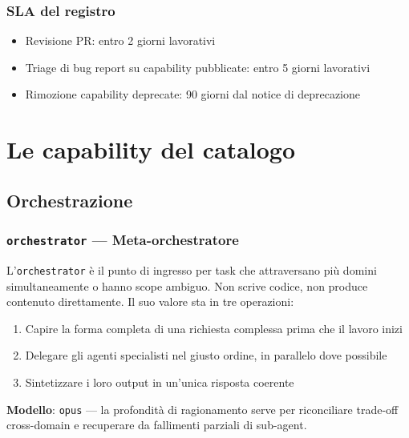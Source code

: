 \documentclass[12pt,a4paper,twoside]{book}
\begin{document}
\section{SLA del registro}

\begin{itemize}
  \item Revisione PR: entro 2 giorni lavorativi
  \item Triage di bug report su capability pubblicate: entro 5 giorni lavorativi
  \item Rimozione capability deprecate: 90 giorni dal notice di deprecazione
\end{itemize}

\part{Le capability del catalogo}

\chapter{Orchestrazione}

\section{\texttt{orchestrator} — Meta-orchestratore}

L'\texttt{orchestrator} è il punto di ingresso per task che attraversano più domini simultaneamente o hanno scope ambiguo. Non scrive codice, non produce contenuto direttamente. Il suo valore sta in tre operazioni:

\begin{enumerate}
  \item Capire la forma completa di una richiesta complessa prima che il lavoro inizi
  \item Delegare gli agenti specialisti nel giusto ordine, in parallelo dove possibile
  \item Sintetizzare i loro output in un'unica risposta coerente
\end{enumerate}

\textbf{Modello}: \texttt{opus} — la profondità di ragionamento serve per riconciliare trade-off cross-domain e recuperare da fallimenti parziali di sub-agent.
\end{document}
